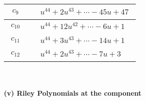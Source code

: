 \documentclass[1p]{elsarticle_modified}
\theoremstyle{definition}
\begin{document}
\begin{tabular}{m{50pt}|m{274pt}}
\hline $$\begin{aligned}c_{9}\end{aligned}$$&$\begin{aligned}
&u^{44}+2 u^{43}+\cdots-45 u+47
\end{aligned}$\\
\hline $$\begin{aligned}c_{10}\end{aligned}$$&$\begin{aligned}
&u^{44}+12 u^{42}+\cdots-6 u+1
\end{aligned}$\\
\hline $$\begin{aligned}c_{11}\end{aligned}$$&$\begin{aligned}
&u^{44}+3 u^{43}+\cdots-14 u+1
\end{aligned}$\\
\hline $$\begin{aligned}c_{12}\end{aligned}$$&$\begin{aligned}
&u^{44}+2 u^{43}+\cdots-7 u+3
\end{aligned}$\\
\hline
\end{tabular}\\~\\
\newpage\renewcommand{\arraystretch}{1}
\flushleft \textbf{(v) Riley Polynomials at the component}\newline \\
\end{document}
